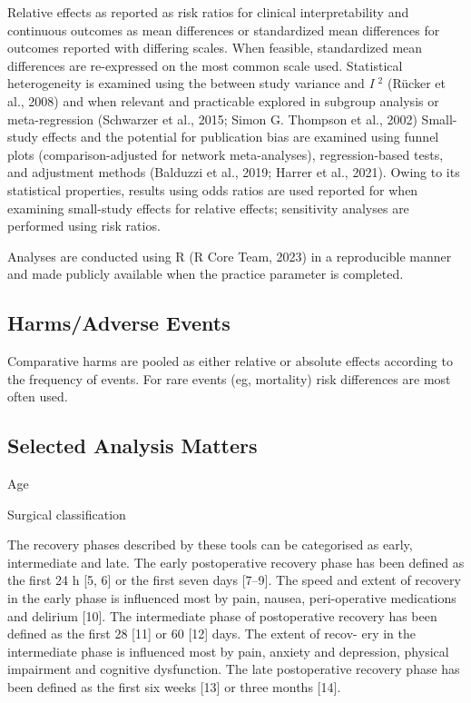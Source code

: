 \documentclass[
  letterpaper,
  DIV=11,
  numbers=noendperiod]{scrreprt}
\begin{document}
Relative effects as reported as risk ratios for clinical
interpretability and continuous outcomes as mean differences or
standardized mean differences for outcomes reported with differing
scales. When feasible, standardized mean differences are re-expressed on
the most common scale used. Statistical heterogeneity is examined using
the between study variance and \emph{I} \(^2\) (Rücker et al., 2008) and
when relevant and practicable explored in subgroup analysis or
meta-regression (Schwarzer et al., 2015; Simon G. Thompson et al., 2002)
Small-study effects and the potential for publication bias are examined
using funnel plots (comparison-adjusted for network meta-analyses),
regression-based tests, and adjustment methods (Balduzzi et al., 2019;
Harrer et al., 2021). Owing to its statistical properties, results using
odds ratios are used reported for when examining small-study effects for
relative effects; sensitivity analyses are performed using risk ratios.

Analyses are conducted using R (R Core Team, 2023) in a reproducible
manner and made publicly available when the practice parameter is
completed.

\hypertarget{harmsadverse-events}{%
\subsection{Harms/Adverse Events}\label{harmsadverse-events}}

Comparative harms are pooled as either relative or absolute effects
according to the frequency of events. For rare events (eg, mortality)
risk differences are most often used.

\hypertarget{selected-analysis-matters}{%
\subsection{Selected Analysis Matters}\label{selected-analysis-matters}}

Age

Surgical classification

The recovery phases described by these tools can be categorised as
early, intermediate and late. The early postoperative recovery phase has
been defined as the first 24 h {[}5, 6{]} or the first seven days
{[}7--9{]}. The speed and extent of recovery in the early phase is
influenced most by pain, nausea, peri-operative medications and delirium
{[}10{]}. The intermediate phase of postoperative recovery has been
defined as the first 28 {[}11{]} or 60 {[}12{]} days. The extent of
recov- ery in the intermediate phase is influenced most by pain, anxiety
and depression, physical impairment and cognitive dysfunction. The late
postoperative recovery phase has been defined as the first six weeks
{[}13{]} or three months {[}14{]}.
\end{document}
